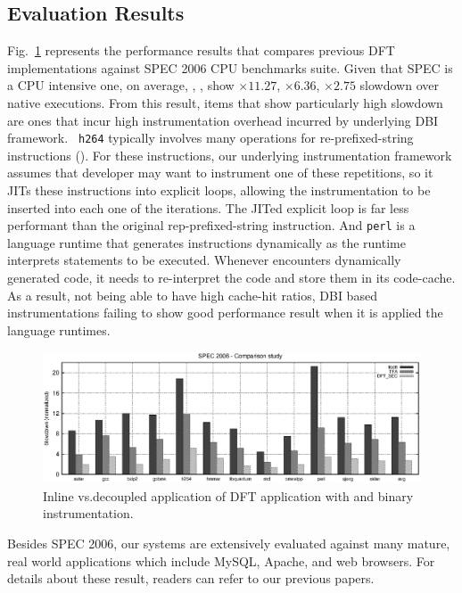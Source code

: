 \subsection{Evaluation Results}
\label{ssec:prev_eval}

Fig.~\ref{fig:s2k6} represents the performance results that compares previous
DFT implementations against SPEC 2006 CPU benchmarks suite. Given that SPEC is
a CPU intensive one, on average, \libdft, \tfa, \sreplica show $\times 11.27$,
$\times 6.36$, $\times 2.75$ slowdown over native executions.
%
From this result, items that show particularly high slowdown are ones that
incur high instrumentation overhead incurred by underlying DBI framework. {\tt
h264} typically involves many operations for re-prefixed-string instructions
(). For these instructions, our
underlying instrumentation framework \ie \pin assumes that developer may want
to instrument one of these repetitions, so it JITs these instructions into
explicit loops, allowing the instrumentation to be inserted into each one of
the iterations. The JITed explicit loop is far less performant than the
original rep-prefixed-string instruction. 
%
And {\tt perl} is a language runtime that generates instructions dynamically as
the runtime interprets statements to be executed. Whenever \pin encounters
dynamically generated code, it needs to re-interpret the code and store them in
its code-cache. As a result, not being able to have high cache-hit ratios, DBI
based instrumentations failing to show good performance result when it is
applied the language runtimes. 

\begin{figure}[tb]
    \centering
    \includegraphics[width=\linewidth]{figs/s2k6.eps}
    \caption{Inline vs.decoupled application of DFT application with \sreplica
    and binary instrumentation.\label{fig:s2k6}}
\end{figure}

Besides SPEC 2006, our systems are extensively evaluated against many mature,
real world applications which include MySQL, Apache, and web browsers. For
details about these result, readers can refer to our previous papers.

